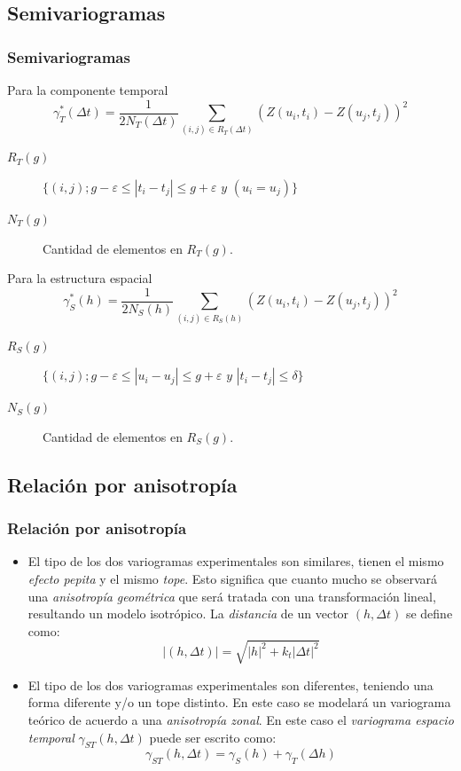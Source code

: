 \documentclass{beamer}
\begin{document}
\subsection{Semivariogramas}
\begin{frame}
\frametitle{Semivariogramas}
Para la componente temporal
\begin{equation}
\gamma_T^*(\Delta t) = \frac{1}{2 N_T(\Delta t)} \sum_{(i,j) \in R_T(\Delta t)} (Z(u_i,t_i)-Z(u_j,t_j))^2
\end{equation}
\begin{description}
\item[$R_T(g)$] $\{ (i,j); g - \varepsilon \leq |t_i - t_j| \leq g + \varepsilon \textit{ y } (u_i = u_j) \}$
\item[$N_T(g)$] Cantidad de elementos en $R_T(g)$.
\end{description}
Para la estructura espacial
\begin{equation}
\gamma_S^*(h) = \frac{1}{2 N_S(h)} \sum_{(i,j) \in R_S(h)} (Z(u_i,t_i)-Z(u_j,t_j))^2
\end{equation}
\begin{description}
\item[$R_S(g)$] $\{ (i,j); g - \varepsilon \leq |u_i - u_j| \leq g + \varepsilon \textit{ y } | t_i - t_j | \leq \delta \}$
\item[$N_S(g)$] Cantidad de elementos en $R_S(g)$.
\end{description}
\end{frame}


\subsection{Relación por anisotropía}
\begin{frame}
\frametitle{Relación por anisotropía}
\begin{itemize}
\item El tipo de los dos variogramas experimentales son similares, tienen el mismo \emph{efecto pepita} y el mismo \emph{tope}. Esto significa que cuanto mucho se observará una \emph{anisotropía geométrica} que será tratada con una transformación lineal, resultando un modelo isotrópico. La \emph{distancia} de un vector $(h,\Delta t)$ se define como:
\begin{equation}
|(h,\Delta t)| = \sqrt{ | h | ^2 + k_t | \Delta t | ^2}
\end{equation}
\item El tipo de los dos variogramas experimentales son diferentes, teniendo una forma diferente y/o un tope distinto. En este caso se modelará un variograma teórico de acuerdo a una \emph{anisotropía zonal}. En este caso el \emph{variograma espacio temporal} $\gamma_{ST}(h,\Delta t)$ puede ser escrito como:
\begin{equation}
\gamma_{ST}(h,\Delta t) = \gamma_S(h) + \gamma_T(\Delta h)
\end{equation}
\end{itemize}
\end{frame}
\end{document}
